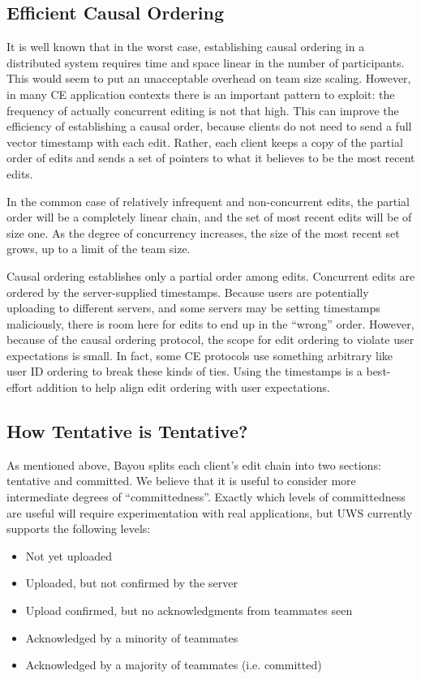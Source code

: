 \documentclass[runningheads]{llncs}
\begin{document}
\subsection{Efficient Causal Ordering}

It is well known that in the worst case, establishing causal ordering in a distributed system requires time and space linear in the number of participants.
This would seem to put an unacceptable overhead on team size scaling.
However, in many CE application contexts there is an important pattern to exploit: the frequency of actually concurrent editing is not that high.
This can improve the efficiency of establishing a causal order, because clients do not need to send a full vector timestamp with each edit.
Rather, each client keeps a copy of the partial order of edits and sends a set of pointers to what it believes to be the most recent edits.

In the common case of relatively infrequent and non-concurrent edits, the partial order will be a completely linear chain, and the set of most recent edits will be of size one.
As the degree of concurrency increases, the size of the most recent set grows, up to a limit of the team size.

Causal ordering establishes only a partial order among edits.
Concurrent edits are ordered by the server-supplied timestamps.
Because users are potentially uploading to different servers, and some servers may be setting timestamps maliciously, there is room here for edits to end up in the ``wrong'' order.
However, because of the causal ordering protocol, the scope for edit ordering to violate user expectations is small.
In fact, some CE protocols use something arbitrary like user ID ordering to break these kinds of ties.
Using the timestamps is a best-effort addition to help align edit ordering with user expectations.

\subsection{How Tentative is Tentative?}

As mentioned above, Bayou splits each client's edit chain into two sections: tentative and committed.
We believe that it is useful to consider more intermediate degrees of ``committedness''.
Exactly which levels of committedness are useful will require experimentation with real applications, but UWS currently supports the following levels:

\begin{itemize}
\item Not yet uploaded
\item Uploaded, but not confirmed by the server
\item Upload confirmed, but no acknowledgments from teammates seen
\item Acknowledged by a minority of teammates
\item Acknowledged by a majority of teammates (i.e. committed)
\end{itemize}
\end{document}
